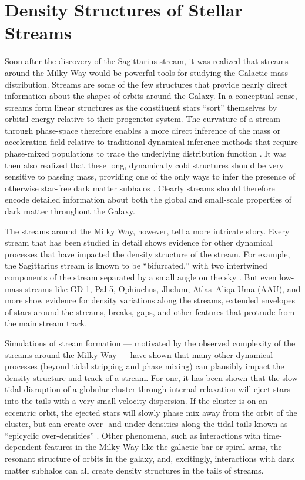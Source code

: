 \documentclass[final,5p,times,twocolumn,authoryear]{elsarticle}
\begin{document}
\section{Density Structures of Stellar Streams}
\label{sec:structure}

Soon after the discovery of the Sagittarius stream, it was realized that streams around
the Milky Way would be powerful tools for studying the Galactic mass distribution.
Streams are some of the few structures that provide nearly direct information about
the shapes of orbits around the Galaxy.
In a conceptual sense, streams form linear structures as the constituent stars ``sort''
themselves by orbital energy relative to their progenitor system.
The curvature of a stream through phase-space therefore enables a more direct inference
of the mass or acceleration field relative to traditional dynamical inference methods
that require phase-mixed populations to trace the underlying distribution function
\citep{bonaca:2018}.
It was then also realized that these long, dynamically cold structures should be very
sensitive to passing mass, providing one of the only ways to infer the presence of
otherwise star-free dark matter subhalos \citep{johnston:2002, ibata:2002, yoon:2011}.
Clearly streams should therefore encode detailed information about both the global and
small-scale properties of dark matter throughout the Galaxy.

The streams around the Milky Way, however, tell a more intricate story.
Every stream that has been studied in detail shows evidence for other dynamical
processes that have impacted the density structure of the stream.
For example, the Sagittarius stream is known to be ``bifurcated,'' with two intertwined
components of the stream separated by a small angle on the sky
\citep[e.g.,][]{belokurov:2006}.
But even low-mass streams like GD-1, Pal 5, Ophiuchus, Jhelum, Atlas--Aliqa Uma (AAU),
and more show evidence for density variations along the streams, extended envelopes of
stars around the streams, breaks, gaps, and other features that protrude from the main
stream track.

Simulations of stream formation --- motivated by the observed complexity of the streams
around the Milky Way --- have shown that many other dynamical processes (beyond tidal
stripping and phase mixing) can plausibly impact the density structure and track of a
stream.
For one, it has been shown that the slow tidal disruption of a globular cluster through
internal relaxation will eject stars into the tails with a very small velocity
dispersion.
If the cluster is on an eccentric orbit, the ejected stars will slowly phase mix away
from the orbit of the cluster, but can create over- and under-densities along the tidal
tails known as ``epicyclic over-densities'' \citep{kupper:2010}.
Other phenomena, such as interactions with time-dependent features in the Milky Way like
the galactic bar or spiral arms, the resonant structure of orbits in the galaxy, and,
excitingly, interactions with dark matter subhalos can all create density structures in
the tails of streams.
\end{document}
